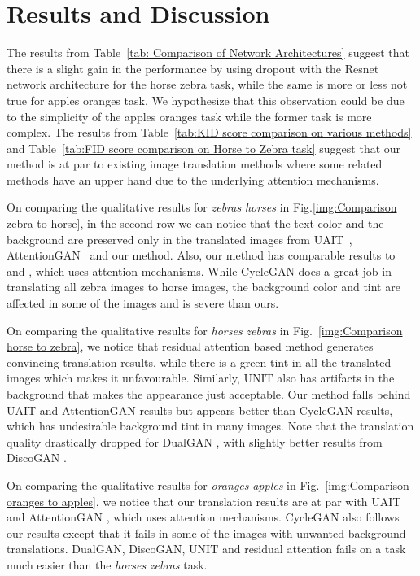 \documentclass[a4paper,twoside]{article}
\begin{document}
\section{Results and Discussion}
\noindent
The results from Table~\ref{tab: Comparison of Network Architectures} suggest that there is a slight gain in the performance by using dropout with the Resnet network architecture for the horse  zebra task, while the same is more or less not true for apples  oranges task. We hypothesize that this observation could be due to the simplicity of the apples  oranges task while the former task is more complex. The results from Table~\ref{tab:KID score comparison on various methods} and Table~\ref{tab:FID score comparison on Horse to Zebra task} suggest that our method is at par to existing image translation methods where some related methods have an upper hand due to the underlying attention mechanisms.

On comparing the qualitative results for \textit{zebras}  \textit{horses} in Fig.\ref{img:Comparison zebra to horse}, in the second row we can notice that the text color and the background are preserved only in the translated images from UAIT~\cite{Mejjati2018UAIT}, AttentionGAN~\cite{attentionGAN} and our method. Also, our method has comparable results to \cite{Mejjati2018UAIT} and \cite{attentionGAN}, which uses attention mechanisms. While CycleGAN does a great job in translating all zebra images to horse images, the background color and tint are affected in some of the images and is severe than ours. 

On comparing the qualitative results for \textit{horses}  \textit{zebras} in Fig.~\ref{img:Comparison horse to zebra}, we notice that residual attention based method \cite{Residual-Attention_WangJQYLZWT17} generates convincing translation results, while there is a green tint in all the translated images which makes it unfavourable. Similarly, UNIT \cite{UNIT_LiuBK17} also has artifacts in the background that makes the appearance just acceptable. Our method falls behind UAIT \cite{Mejjati2018UAIT} and AttentionGAN results \cite{attentionGAN} but appears better than CycleGAN results, which has undesirable background tint in many images. Note that the translation quality drastically dropped for DualGAN \cite{DualGAN_YiZTG17}, with slightly better results from DiscoGAN \cite{DiscoGAN_KimCKLK17}.

On comparing the qualitative results for \textit{oranges}  \textit{apples} in Fig.~\ref{img:Comparison oranges to apples}, we notice that our translation results are at par with UAIT \cite{Mejjati2018UAIT} and AttentionGAN \cite{attentionGAN}, which uses attention mechanisms. CycleGAN also follows our results except that it fails in some of the images with unwanted background translations. DualGAN, DiscoGAN, UNIT and residual attention \cite{Residual-Attention_WangJQYLZWT17} fails on a task much easier than the \textit{horses}  \textit{zebras} task.
\end{document}
